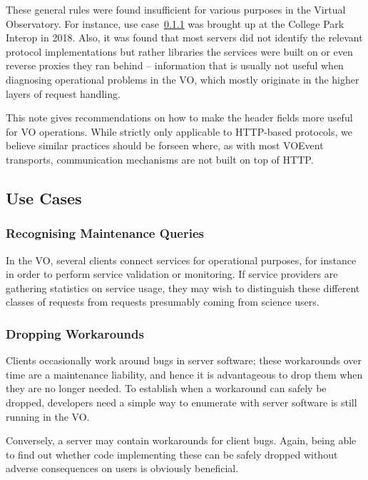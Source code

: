 \documentclass[11pt,a4paper]{ivoa}
\begin{document}
These general rules were found insufficient for various purposes in the
Virtual Observatory.  For instance, use case~\ref{uc:stats} was brought
up at the College Park Interop in 2018.  Also, it was found that most
servers did not identify the relevant protocol implementations but
rather libraries the services were built on or even reverse proxies they
ran behind -- information that is usually not useful when diagnosing
operational problems in the VO, which mostly originate in the higher
layers of request handling.

This note gives recommendations on how to make the header fields more
useful for VO operations.  While strictly only applicable to HTTP-based
protocols, we believe similar practices should be forseen where, as
with most VOEvent transports, communication mechanisms are not built on
top of HTTP.


\subsection{Use Cases}

\subsubsection{Recognising Maintenance Queries}
\label{uc:stats}

In the VO, several clients connect services for operational purposes,
for instance in order to perform service validation or monitoring. If
service providers are gathering statistics on service usage, they may
wish to distinguish these different classes of requests from requests
presumably coming from science users.

\subsubsection{Dropping Workarounds}

Clients occasionally work around bugs in server software; these
workarounds over time are a maintenance liability, and hence it is
advantageous to drop them when they are no longer needed.  To establish
when a workaround can safely be dropped, developers need a simple way to
enumerate with server software is still running in the VO.

Conversely, a server may contain workarounds for client bugs.  Again,
being able to find out whether code implementing these can be safely
dropped without adverse consequences on users is obviously beneficial.
\end{document}
